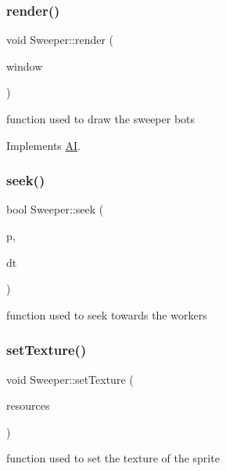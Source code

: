 \subsubsection{\texorpdfstring{render()}{render()}}
{\footnotesize\ttfamily void Sweeper\+::render (\begin{DoxyParamCaption}\item[{sf\+::\+Render\+Window \&}]{window }\end{DoxyParamCaption})\hspace{0.3cm}{\ttfamily [virtual]}}

function used to draw the sweeper bots 

Implements \mbox{\hyperlink{class_a_i_a7d2082a5c1692991512725797346705f}{AI}}.

\mbox{\label{class_sweeper_a385f654eafc2891bcff50e46e586abd8}} 
\subsubsection{\texorpdfstring{seek()}{seek()}}
{\footnotesize\ttfamily bool Sweeper\+::seek (\begin{DoxyParamCaption}\item[{\mbox{\hyperlink{struct_sweeper_1_1bool_vec_pair}{bool\+Vec\+Pair}} \&}]{p,  }\item[{double}]{dt }\end{DoxyParamCaption})}

function used to seek towards the workers \mbox{\label{class_sweeper_ae4cd1dcb134140b6a357c3e61b96d326}} 
\subsubsection{\texorpdfstring{setTexture()}{setTexture()}}
{\footnotesize\ttfamily void Sweeper\+::set\+Texture (\begin{DoxyParamCaption}\item[{\mbox{\hyperlink{class_resource_manager}{Resource\+Manager}} \&}]{resources }\end{DoxyParamCaption})}

function used to set the texture of the sprite \mbox{\label{class_sweeper_aa186e2bb4c00d8f00c6a947cfd7b4a08}} 
